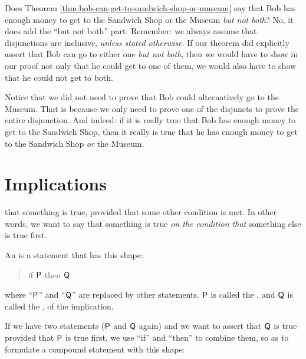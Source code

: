 \documentclass[../../../main.tex]{subfiles}
\begin{document}
\begin{aside}
  \begin{remark}
    Does Theorem \ref{thm:bob-can-get-to-sandwich-shop-or-museum} say that Bob has enough money to get to the Sandwich Shop or the Museum \emph{but not both}? No, it does add the ``but not both'' part. Remember: we always assume that disjunctions are inclusive, \emph{unless stated otherwise}. If our theorem did explicitly assert that Bob can go to either one \emph{but not both}, then we would have to show in our proof not only that he could get to one of them, we would also have to show that he could not get to both.
  \end{remark}
\end{aside}

Notice that we did not need to prove that Bob could alternatively go to the Museum. That is because we only need to prove one of the disjuncts to prove the entire disjunction. And indeed: if it is really true that Bob has enough money to get to the Sandwich Shop, then it really is true that he has enough money to get to the Sandwich Shop \emph{or} the Museum.


\section{Implications}

 that something is true, provided that some other condition is met. In other words, we want to say that something is true \emph{on the condition that} something else is true first.

\begin{terminology}
  An  is a statement that has this shape:
    
  \begin{quote}
    if $\P/$ then $\Q/$
  \end{quote}
    
  \noindent
  where ``$\P/$'' and ``$\Q/$'' are replaced by other statements. $\P/$ is called the , and $\Q/$ is called the , of the implication.
\end{terminology}

If we have two statements ($\P/$ and $\Q/$ again) and we want to assert that $\Q/$ is true provided that $\P/$ is true first, we use ``if'' and ``then'' to combine them, so as to formulate a compound statement with this shape:
\end{document}
